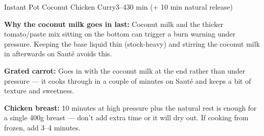 \begin{recipebox}{Instant Pot Coconut Chicken Curry}{3--4}{30 min (+ 10 min natural release)}
\begin{notes}
\textbf{Why the coconut milk goes in last:} Coconut milk and the thicker tomato/paste mix sitting on the bottom can trigger a burn warning under pressure. Keeping the base liquid thin (stock-heavy) and stirring the coconut milk in afterwards on Saut\'{e} avoids this.

\textbf{Grated carrot:} Goes in with the coconut milk at the end rather than under pressure --- it cooks through in a couple of minutes on Saut\'{e} and keeps a bit of texture and sweetness.

\textbf{Chicken breast:} 10 minutes at high pressure plus the natural rest is enough for a single 400g breast --- don't add extra time or it will dry out. If cooking from frozen, add 3--4 minutes.
\end{notes}

\end{recipebox}
